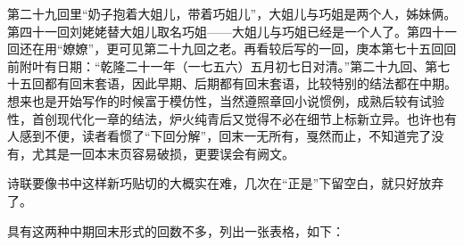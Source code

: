 \par 第二十九回里“奶子抱着大姐儿，带着巧姐儿”，大姐儿与巧姐是两个人，姊妹俩。第四十一回刘姥姥替大姐儿取名巧姐——大姐儿与巧姐已经是一个人了。第四十一回还在用“嫽嫽”，更可见第二十九回之老。再看较后写的一回，庚本第七十五回回前附叶有日期：“乾隆二十一年（一七五六）五月初七日对清。”第二十九回、第七十五回都有回末套语，因此早期、后期都有回末套语，比较特别的结法都在中期。想来也是开始写作的时候富于模仿性，当然遵照章回小说惯例，成熟后较有试验性，首创现代化一章的结法，炉火纯青后又觉得不必在细节上标新立异。也许也有人感到不便，读者看惯了“下回分解”，回末一无所有，戛然而止，不知道完了没有，尤其是一回本末页容易破损，更要误会有阙文。
\par 诗联要像书中这样新巧贴切的大概实在难，几次在“正是”下留空白，就只好放弃了。
\par 具有这两种中期回末形式的回数不多，列出一张表格，如下：

